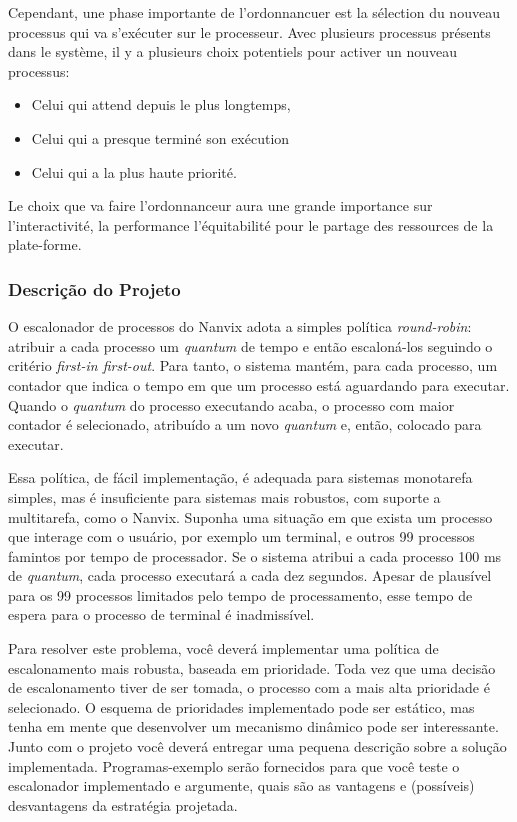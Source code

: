 \documentclass[11pt]{article}
\newif\ifbr
\newif\ifen
\begin{document}
		Cependant, une phase importante de l'ordonnancuer est la sélection du
		nouveau processus qui va s'exécuter sur le processeur. Avec plusieurs
		processus présents dans le système, il y a plusieurs choix potentiels
		pour activer un nouveau processus:

		\begin{itemize}
			\item Celui qui attend depuis le plus longtemps,
			\item Celui qui a presque terminé son exécution
			\item Celui qui a la plus haute priorité.
		\end{itemize}

		Le choix que va faire l'ordonnanceur aura une grande importance sur
		l'interactivité, la performance l'équitabilité pour le
		partage des ressources de la plate-forme.

\fi\fi\fi

\ifbr
	\subsubsection*{Descrição do Projeto}

		O escalonador de processos do Nanvix adota a simples política
		\textit{round-robin}: atribuir a cada processo um \textit{quantum}
		de tempo e então escaloná-los seguindo o critério \textit{first-in
		first-out}. Para tanto, o sistema mantém, para cada processo, um
		contador que indica o tempo em que um processo está aguardando para
		executar. Quando o \textit{quantum} do processo executando acaba, o
		processo com maior contador é selecionado, atribuído a um novo
		\textit{quantum} e, então, colocado para executar.

		Essa política, de fácil implementação, é adequada para sistemas
		monotarefa simples, mas é insuficiente para sistemas mais robustos,
		com suporte a multitarefa, como o Nanvix. Suponha uma situação em
		que exista um processo que interage com o usuário, por exemplo um
		terminal, e outros 99 processos famintos por tempo de processador.
		Se o sistema atribui a cada processo 100 ms de \textit{quantum},
		cada processo executará a cada dez segundos. Apesar de plausível
		para os 99 processos limitados pelo tempo de processamento, esse
		tempo de espera para o processo de terminal é inadmissível.

		Para resolver este problema, você deverá implementar uma política de
		escalonamento mais robusta, baseada em prioridade. Toda vez que uma
		decisão de escalonamento tiver de ser tomada, o processo com a mais
		alta prioridade é selecionado. O esquema de prioridades implementado
		pode ser estático, mas tenha em mente que desenvolver um mecanismo
		dinâmico pode ser interessante. Junto com o projeto você deverá
		entregar uma pequena descrição sobre a solução implementada.
		Programas-exemplo serão fornecidos para que você teste o escalonador
		implementado e argumente, quais são as vantagens e (possíveis)
		desvantagens da estratégia projetada.
\else\ifen
\end{document}
